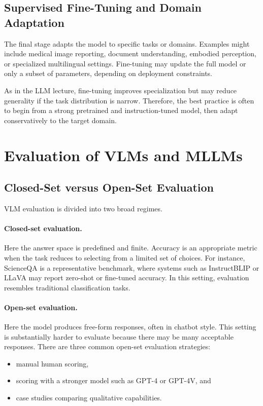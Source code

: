 \documentclass{article}
\begin{document}
\subsection{Supervised Fine-Tuning and Domain Adaptation}

The final stage adapts the model to specific tasks or domains. Examples might include medical image reporting, document understanding, embodied perception, or specialized multilingual settings. Fine-tuning may update the full model or only a subset of parameters, depending on deployment constraints.

As in the LLM lecture, fine-tuning improves specialization but may reduce generality if the task distribution is narrow. Therefore, the best practice is often to begin from a strong pretrained and instruction-tuned model, then adapt conservatively to the target domain.

\section{Evaluation of VLMs and MLLMs}

\subsection{Closed-Set versus Open-Set Evaluation}

VLM evaluation is divided into two broad regimes.

\paragraph{Closed-set evaluation.} 
Here the answer space is predefined and finite. Accuracy is an appropriate metric when the task reduces to selecting from a limited set of choices. For instance, ScienceQA is a representative benchmark, where systems such as InstructBLIP or LLaVA may report zero-shot or fine-tuned accuracy. In this setting, evaluation resembles traditional classification tasks.

\paragraph{Open-set evaluation.} 
Here the model produces free-form responses, often in chatbot style. This setting is substantially harder to evaluate because there may be many acceptable responses. There are three common open-set evaluation strategies:
\begin{itemize}
    \item manual human scoring,
    \item scoring with a stronger model such as GPT-4 or GPT-4V, and
    \item case studies comparing qualitative capabilities.
\end{itemize}
\end{document}
